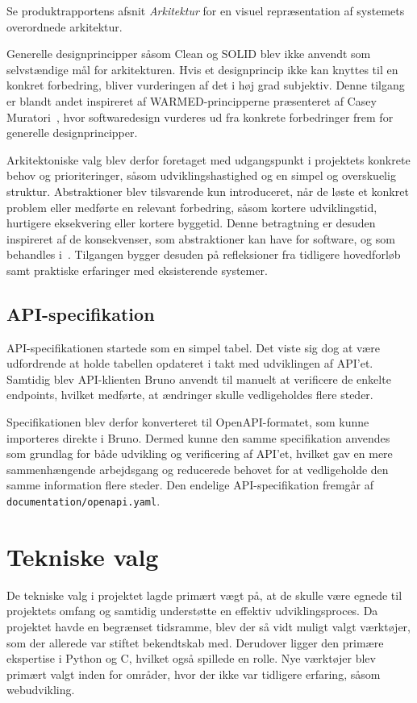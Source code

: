 \documentclass[a4paper, 11pt]{article}
\begin{document}
Se produktrapportens afsnit \textit{Arkitektur} for en visuel repræsentation af
systemets overordnede arkitektur.

Generelle designprincipper såsom Clean og SOLID blev ikke anvendt som selvstændige mål for
arkitekturen. Hvis et designprincip ikke kan knyttes til en konkret forbedring, bliver
vurderingen af det i høj grad subjektiv. Denne tilgang er blandt andet inspireret af
WARMED-principperne præsenteret af Casey Muratori~\cite{where_does_bad_code_come_from},
hvor softwaredesign vurderes ud fra konkrete forbedringer frem for generelle
designprincipper.

Arkitektoniske valg blev derfor foretaget med udgangspunkt i projektets konkrete behov og
prioriteringer, såsom udviklingshastighed og en simpel og overskuelig struktur.
Abstraktioner blev tilsvarende kun introduceret, når de løste et konkret problem eller
medførte en relevant forbedring, såsom kortere udviklingstid, hurtigere eksekvering eller
kortere byggetid. Denne betragtning er desuden inspireret af de konsekvenser, som
abstraktioner kan have for software, og som behandles
i~\cite{clean_code_horrible_performance}. Tilgangen bygger desuden på refleksioner fra
tidligere hovedforløb samt praktiske erfaringer med eksisterende systemer.

\subsection{API-specifikation}

API-specifikationen startede som en simpel tabel. Det viste sig dog at være udfordrende at
holde tabellen opdateret i takt med udviklingen af API'et. Samtidig blev API-klienten Bruno
anvendt til manuelt at verificere de enkelte endpoints, hvilket medførte, at ændringer skulle
vedligeholdes flere steder.

Specifikationen blev derfor konverteret til OpenAPI-formatet, som kunne importeres direkte i
Bruno. Dermed kunne den samme specifikation anvendes som grundlag for både udvikling og
verificering af API'et, hvilket gav en mere sammenhængende arbejdsgang og reducerede behovet
for at vedligeholde den samme information flere steder. Den endelige API-specifikation
fremgår af \texttt{documentation/openapi.yaml}.

\section{Tekniske valg}

De tekniske valg i projektet lagde primært vægt på, at de skulle være egnede til projektets
omfang og samtidig understøtte en effektiv udviklingsproces. Da projektet havde en begrænset
tidsramme, blev der så vidt muligt valgt værktøjer, som der allerede var stiftet bekendtskab
med. Derudover ligger den primære ekspertise i Python og C, hvilket også spillede en rolle.
Nye værktøjer blev primært valgt inden for områder, hvor der ikke var tidligere erfaring,
såsom webudvikling.
\end{document}
